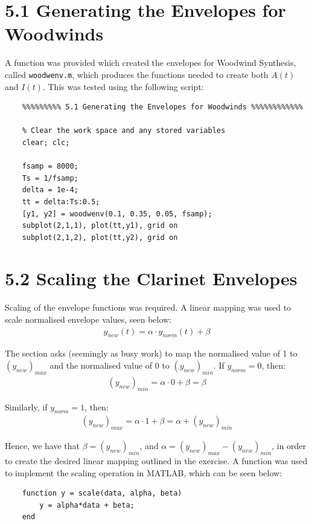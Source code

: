 \documentclass{article}
\begin{document}
\section{5.1 Generating the Envelopes for Woodwinds}
A function was provided which created the envelopes for Woodwind Synthesis, called \verb|woodwenv.m|, which produces the functions needed to create both $A(t)$ and $I(t)$. This was tested using the following script:
\begin{lstlisting}
	%%%%%%%%% 5.1 Generating the Envelopes for Woodwinds %%%%%%%%%%%%
	
	% Clear the work space and any stored variables
	clear; clc;
	
	fsamp = 8000;
	Ts = 1/fsamp;
	delta = 1e-4;
	tt = delta:Ts:0.5;
	[y1, y2] = woodwenv(0.1, 0.35, 0.05, fsamp);
	subplot(2,1,1), plot(tt,y1), grid on
	subplot(2,1,2), plot(tt,y2), grid on
\end{lstlisting}

\section{5.2 Scaling the Clarinet Envelopes}
Scaling of the envelope functions was required. A linear mapping was used to scale normalised envelope values, seen below:
\begin{align*}
	y_{new}(t) = \alpha \cdot y_{norm}(t) + \beta
\end{align*}

The section asks (seemingly as busy work) to map the normalised value of 1 to $(y_{new})_{max}$ and the normalised value of 0 to $(y_{new})_{min}$. If $y_{norm} = 0$, then:
\begin{align*}
	(y_{new})_{min} = \alpha \cdot 0 + \beta = \beta
\end{align*}

Similarly, if $y_{norm} = 1$, then:
\begin{align*}
	(y_{new})_{max} = \alpha \cdot 1 + \beta = \alpha + (y_{new})_{min}
\end{align*}

Hence, we have that $\beta = (y_{new})_{min}$, and $\alpha = (y_{new})_{max} - (y_{new})_{min}$, in order to create the desired linear mapping outlined in the exercise. A function was used to implement the scaling operation in MATLAB, which can be seen below:
\begin{lstlisting}
	function y = scale(data, alpha, beta)
	    y = alpha*data + beta;
	end
\end{lstlisting}
\end{document}
